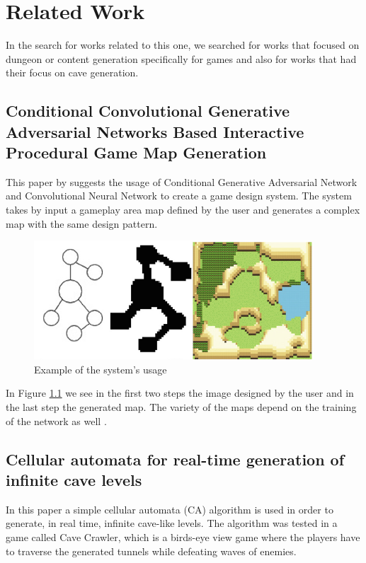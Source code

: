 \chapter{Related Work}

In the search for works related to this one, we searched for works that focused on dungeon or content generation specifically for games and also for works that had their focus on cave generation.

\section{Conditional Convolutional Generative
Adversarial Networks Based Interactive
Procedural Game Map Generation}

This paper by \citeauthor{ping:2020} suggests the usage of Conditional Generative Adversarial Network and Convolutional Neural Network to create a game design system. The system takes by input a gameplay area map defined by the user and generates a complex map with the same design pattern.

\begin{figure}[h]
    \caption{Example of the system's usage}
    \centerline{\includegraphics{images/related_work/ping.png}}
    \label{fig:ping}
\end{figure}
In Figure \ref{fig:ping} we see in the first two steps the image designed by the user and in the last step the generated map. The variety of the maps depend on the training of the network as well \citeyear{ping:2020}.

\section{Cellular automata for real-time generation
of infinite cave levels}

In this paper a simple cellular automata (CA) algorithm is used in order to generate, in real time, infinite cave-like levels. The algorithm was tested in a game called Cave Crawler, which is a birds-eye view game where the players have to traverse the generated tunnels while defeating waves of enemies. 


